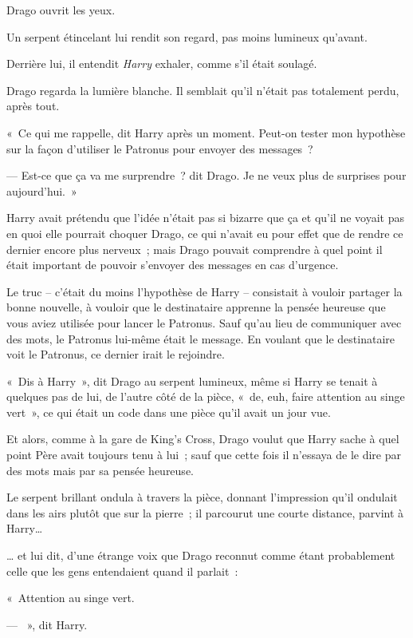 Drago ouvrit les yeux.

Un serpent étincelant lui rendit son regard, pas moins lumineux qu'avant.

Derrière lui, il entendit \emph{Harry} exhaler, comme s'il était soulagé.

Drago regarda la lumière blanche. Il semblait qu'il n'était pas totalement perdu, après tout.

«~Ce qui me rappelle, dit Harry après un moment. Peut-on tester mon hypothèse sur la façon d'utiliser le Patronus pour envoyer des messages~?

--- Est-ce que ça va me surprendre~? dit Drago. Je ne veux plus de surprises pour aujourd'hui.~»

\later

Harry avait prétendu que l'idée n'était pas si bizarre que ça et qu'il ne voyait pas en quoi elle pourrait choquer Drago, ce qui n'avait eu pour effet que de rendre ce dernier encore plus nerveux~; mais Drago pouvait comprendre à quel point il était important de pouvoir s'envoyer des messages en cas d'urgence.

Le truc -- c'était du moins l'hypothèse de Harry -- consistait à vouloir partager la bonne nouvelle, à vouloir que le destinataire apprenne la pensée heureuse que vous aviez utilisée pour lancer le Patronus. Sauf qu'au lieu de communiquer avec des mots, le Patronus lui-même était le message. En voulant que le destinataire voit le Patronus, ce dernier irait le rejoindre.

«~Dis à Harry~», dit Drago au serpent lumineux, même si Harry se tenait à quelques pas de lui, de l'autre côté de la pièce, «~de, euh, faire attention au singe vert~», ce qui était un code dans une pièce qu'il avait un jour vue.

Et alors, comme à la gare de King's Cross, Drago voulut que Harry sache à quel point Père avait toujours tenu à lui~; sauf que cette fois il n'essaya de le dire par des mots mais par sa pensée heureuse.

Le serpent brillant ondula à travers la pièce, donnant l'impression qu'il ondulait dans les airs plutôt que sur la pierre~; il parcourut une courte distance, parvint à Harry…

… et lui dit, d'une étrange voix que Drago reconnut comme étant probablement celle que les gens entendaient quand il parlait~:

«~Attention au singe vert.

--- ~», dit Harry.

